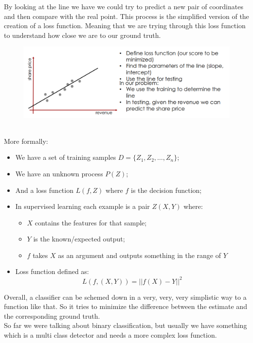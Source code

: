 By looking at the line we have we could try to predict a new pair of coordinates and then compare with the real point. This process is the simplified version of the creation of a loss function.
Meaning that we are trying through this loss function to understand how close we are to our ground truth.
\begin{figure}[h]
    \centering
    \includegraphics[scale=0.4]{Figures/Regression.png}
\end{figure}
\\More formally:
\begin{itemize}
    \item We have a set of training samples $D=\{Z_1, Z_2, …, Z_n\}$;
    \item We have an unknown process $P(Z)$;
    \item And a loss function $L(f,Z)$ where $f$ is the decision function;
    \item In supervised learning each example is a pair $Z(X,Y)$ where:
        \begin{itemize}
            \item $X$ contains the features for that sample;
            \item $Y$ is the known/expected output;
            \item $f$ takes $X$ as an argument and outputs something in the range of $Y$
        \end{itemize}
    \item Loss function defined as:\[ L(f, (X,Y))=||f(X)-Y||^2\]
\end{itemize}
Overall, a classifier can be schemed down in a very, very, very simplistic way to a function like that. So it tries to minimize the difference between the estimate and the corresponding ground truth.
\\So far we were talking about binary classification, but usually we have something which is a multi class detector and needs a more complex loss function.

